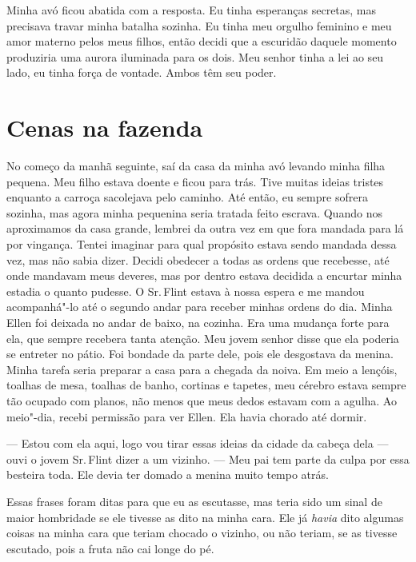Minha avó ficou abatida com a resposta.
Eu tinha esperanças secretas, mas precisava travar minha batalha
sozinha. Eu tinha meu orgulho feminino e meu amor materno pelos meus
filhos, então decidi que a escuridão daquele momento produziria uma
aurora iluminada para os dois. Meu senhor tinha a lei ao seu lado, eu
tinha força de vontade. Ambos têm seu poder.

\chapter*{Cenas na fazenda}

No começo da manhã seguinte, saí da
casa da minha avó levando minha filha pequena. Meu filho estava doente e
ficou para trás. Tive muitas ideias tristes enquanto a carroça
sacolejava pelo caminho. Até então, eu sempre sofrera sozinha, mas agora
minha pequenina seria tratada feito escrava. Quando nos aproximamos da
casa grande, lembrei da outra vez em que fora mandada para lá por
vingança. Tentei imaginar para qual propósito estava sendo mandada dessa
vez, mas não sabia dizer. Decidi obedecer a todas as ordens que
recebesse, até onde mandavam meus deveres, mas por dentro estava
decidida a encurtar minha estadia o quanto pudesse. O Sr.\,Flint estava à
nossa espera e me mandou acompanhá"-lo até o segundo andar para receber
minhas ordens do dia. Minha Ellen foi deixada no andar de baixo, na
cozinha. Era uma mudança forte para ela, que sempre recebera tanta
atenção. Meu jovem senhor disse que ela poderia se entreter no pátio.
Foi bondade da parte dele, pois ele desgostava da menina. Minha tarefa
seria preparar a casa para a chegada da noiva. Em meio a lençóis,
toalhas de mesa, toalhas de banho, cortinas e tapetes, meu cérebro
estava sempre tão ocupado com planos, não menos que meus dedos estavam
com a agulha. Ao meio"-dia, recebi permissão para ver Ellen. Ela havia
chorado até dormir.

--- Estou com ela aqui, logo vou tirar essas ideias da cidade da cabeça
dela --- ouvi o jovem Sr.\,Flint dizer a um vizinho. --- Meu pai tem
parte da culpa por essa besteira toda. Ele devia ter domado a menina
muito tempo atrás.

Essas frases foram ditas para que eu as escutasse, mas teria sido um
sinal de maior hombridade se ele tivesse as dito na minha cara. Ele já
\emph{havia} dito algumas coisas na minha cara que teriam chocado o
vizinho, ou não teriam, se as tivesse escutado, pois a fruta não cai
longe do pé.

